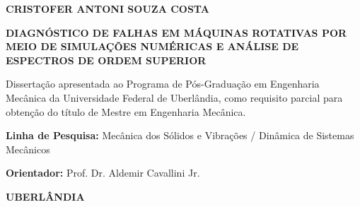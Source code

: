 
\begin{titlepage}
    \centering
    
    {\Large \textbf{CRISTOFER ANTONI SOUZA COSTA}}
    
    \vspace{2cm}
    
    {\Large \textbf{DIAGNÓSTICO DE FALHAS EM MÁQUINAS ROTATIVAS POR MEIO DE SIMULAÇÕES NUMÉRICAS E ANÁLISE DE ESPECTROS DE ORDEM SUPERIOR}}
    
    \vspace{2cm}
    
    \begin{flushright}
        \begin{minipage}{0.7\textwidth}
            Dissertação apresentada ao Programa de Pós-Graduação em Engenharia Mecânica da Universidade Federal de Uberlândia, como requisito parcial para obtenção do título de Mestre em Engenharia Mecânica.
            
            \vspace{1cm}
            
            \textbf{Linha de Pesquisa:} Mecânica dos Sólidos e Vibrações / Dinâmica de Sistemas Mecânicos
            
            \vspace{1cm}
            
            \textbf{Orientador:} Prof. Dr. Aldemir Cavallini Jr.
        \end{minipage}
    \end{flushright}
    
    \vfill
    
    {\large \textbf{UBERLÂNDIA}}
    
    {\large \textbf{\the\year}}
    
\end{titlepage}

\cleardoublepage
